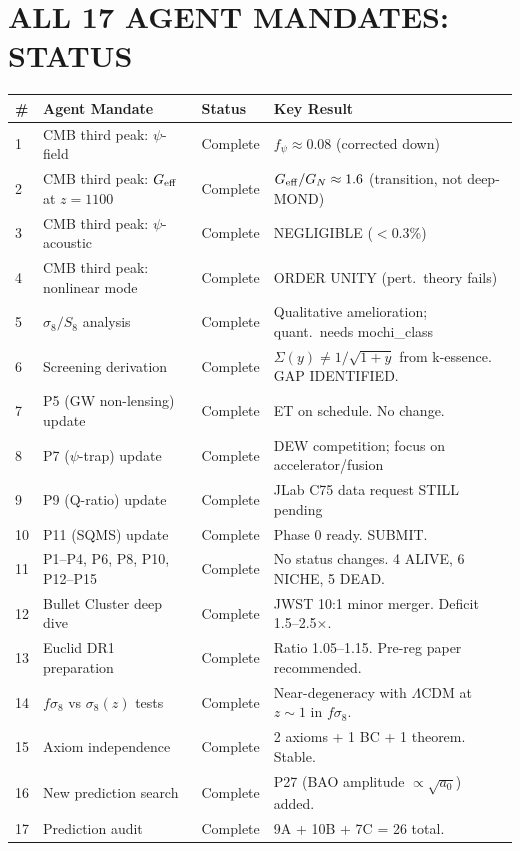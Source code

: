 \documentclass[11pt]{article}
\newcommand{\LCDM}{$\Lambda$CDM}
\newcommand{\Geff}{G_{\rm eff}}
\newcommand{\aM}{a_0}
\begin{document}
\section{ALL 17 AGENT MANDATES: STATUS}

\begin{longtable}{p{0.4cm}p{4cm}p{2cm}p{5cm}}
\toprule
\# & Agent Mandate & Status & Key Result \\
\midrule
\endhead
1 & CMB third peak: $\psi$-field & Complete & $f_\psi \approx 0.08$
  (corrected down) \\
2 & CMB third peak: $\Geff$ at $z=1100$ & Complete & $\Geff/G_N \approx
  1.6$ (transition, not deep-MOND) \\
3 & CMB third peak: $\psi$-acoustic & Complete & NEGLIGIBLE ($<0.3$\%) \\
4 & CMB third peak: nonlinear mode & Complete & ORDER UNITY (pert.\ theory
  fails) \\
5 & $\sigma_8/S_8$ analysis & Complete & Qualitative amelioration;
  quant.\ needs mochi\_class \\
6 & Screening derivation & Complete & $\Sigma(y) \neq 1/\sqrt{1+y}$
  from k-essence.  GAP IDENTIFIED. \\
7 & P5 (GW non-lensing) update & Complete & ET on schedule. No change. \\
8 & P7 ($\psi$-trap) update & Complete & DEW competition; focus on
  accelerator/fusion \\
9 & P9 (Q-ratio) update & Complete & JLab C75 data request STILL
  pending \\
10 & P11 (SQMS) update & Complete & Phase 0 ready.  SUBMIT. \\
11 & P1--P4, P6, P8, P10, P12--P15 & Complete & No status changes.
  4 ALIVE, 6 NICHE, 5 DEAD. \\
12 & Bullet Cluster deep dive & Complete & JWST 10:1 minor merger.
  Deficit 1.5--2.5$\times$. \\
13 & Euclid DR1 preparation & Complete & Ratio 1.05--1.15.
  Pre-reg paper recommended. \\
14 & $f\sigma_8$ vs $\sigma_8(z)$ tests & Complete & Near-degeneracy
  with \LCDM{} at $z \sim 1$ in $f\sigma_8$. \\
15 & Axiom independence & Complete & 2 axioms + 1 BC + 1 theorem.
  Stable. \\
16 & New prediction search & Complete & P27 (BAO amplitude $\propto
  \sqrt{\aM}$) added. \\
17 & Prediction audit & Complete & 9A + 10B + 7C = 26 total. \\
\bottomrule
\end{longtable}
\end{document}
